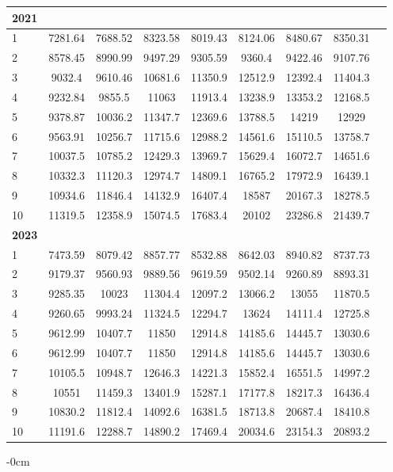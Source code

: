 \documentclass[jimaging,article,submit,pdftex,moreauthors]{Definitions/mdpi}
\begin{document}
\begin{longtable}{@{\extracolsep{\fill}}p{1.5cm}cccccccc@{}}
\bf{2021} &  &  &  & & & & \\
\hline
1 & 7281.64 & 7688.52 & 8323.58 & 8019.43 & 8124.06 & 8480.67 & 8350.31 \\
2 & 8578.45 & 8990.99 & 9497.29 & 9305.59 & 9360.4 & 9422.46 & 9107.76 \\
3 & 9032.4 & 9610.46 & 10681.6 & 11350.9 & 12512.9 & 12392.4 & 11404.3 \\
4 & 9232.84 & 9855.5 & 11063 & 11913.4 & 13238.9 & 13353.2 & 12168.5 \\
5 & 9378.87 & 10036.2 & 11347.7 & 12369.6 & 13788.5 & 14219 & 12929 \\
6 & 9563.91 & 10256.7 & 11715.6 & 12988.2 & 14561.6 & 15110.5 & 13758.7 \\
7 & 10037.5 & 10785.2 &12429.3 & 13969.7 & 15629.4 & 16072.7 & 14651.6 \\
8 & 10332.3 & 11120.3 & 12974.7 & 14809.1 & 16765.2 & 17972.9 & 16439.1 \\
9 & 10934.6 & 11846.4 & 14132.9 & 16407.4 & 18587 & 20167.3 & 18278.5 \\
10 & 11319.5 & 12358.9 & 15074.5 & 17683.4 & 20102 & 23286.8 & 21439.7 \\
\hline
\bf{2023} &  &  &  & & & & \\
\hline
1 & 7473.59 & 8079.42 & 8857.77 & 8532.88 & 8642.03 & 8940.82 & 8737.73 \\
2 & 9179.37 & 9560.93 & 9889.56 & 9619.59 & 9502.14 & 9260.89 & 8893.31 \\
3 & 9285.35 & 10023 & 11304.4 & 12097.2 & 13066.2 & 13055 & 11870.5 \\
4 & 9260.65 & 9993.24 & 11324.5 & 12294.7 & 13624 & 14111.4 & 12725.8 \\
5 & 9612.99 & 10407.7 & 11850 & 12914.8 & 14185.6 & 14445.7 & 13030.6 \\
6 & 9612.99 & 10407.7 & 11850 & 12914.8 & 14185.6 & 14445.7 & 13030.6 \\
7 & 10105.5 & 10948.7 & 12646.3 & 14221.3 & 15852.4 & 16551.5 & 14997.2 \\
8 & 10551 & 11459.3 & 13401.9 & 15287.1 & 17177.8 & 18217.3 & 16436.4 \\
9 & 10830.2 & 11812.4 & 14092.6 & 16381.5 & 18713.8 & 20687.4 & 18410.8 \\
10 & 11191.6 & 12288.7 & 14890.2 & 17469.4 & 20034.6 & 23154.3 & 20893.2 \\
\hline
\end{longtable}

\begin{adjustwidth}{-\extralength}{0cm}




\end{adjustwidth}
\end{document}
